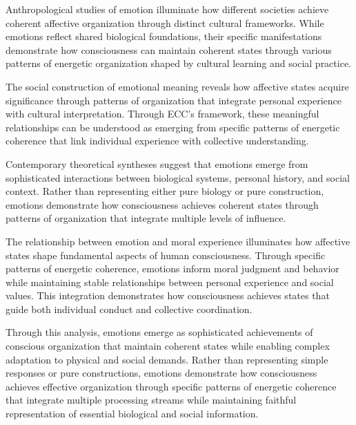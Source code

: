 Anthropological studies of emotion \cite{Rosaldo1980, da2024mathematical} illuminate how different societies achieve coherent affective organization through distinct cultural frameworks. While emotions reflect shared biological foundations, their specific manifestations demonstrate how consciousness can maintain coherent states through various patterns of energetic organization shaped by cultural learning and social practice.

The social construction of emotional meaning \cite{White1994, pinotsis2023cytoelectric} reveals how affective states acquire significance through patterns of organization that integrate personal experience with cultural interpretation. Through ECC's framework, these meaningful relationships can be understood as emerging from specific patterns of energetic coherence that link individual experience with collective understanding.

Contemporary theoretical syntheses \cite{Wentworth1992, butlin2023consciousnessartificialintelligenceinsights} suggest that emotions emerge from sophisticated interactions between biological systems, personal history, and social context. Rather than representing either pure biology or pure construction, emotions demonstrate how consciousness achieves coherent states through patterns of organization that integrate multiple levels of influence.

The relationship between emotion and moral experience \cite{LeDoux2015, kukushkin2024massed} illuminates how affective states shape fundamental aspects of human consciousness. Through specific patterns of energetic coherence, emotions inform moral judgment and behavior while maintaining stable relationships between personal experience and social values. This integration demonstrates how consciousness achieves states that guide both individual conduct and collective coordination.

Through this analysis, emotions emerge as sophisticated achievements of conscious organization that maintain coherent states while enabling complex adaptation to physical and social demands. Rather than representing simple responses or pure constructions, emotions demonstrate how consciousness achieves effective organization through specific patterns of energetic coherence that integrate multiple processing streams while maintaining faithful representation of essential biological and social information.